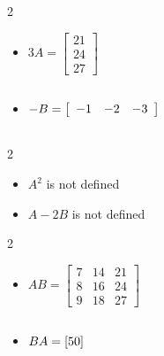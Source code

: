 \documentclass{ximera}
\begin{document}
\begin{enumerate}
\begin{multicols}{2}
\begin{itemize}
\item  $3A = \left[ \begin{array}{r} 21 \\ 24 \\ 27 \end{array} \right]$

\item $-B = \left[ \begin{array}{rrr} -1 & -2 & -3 \end{array} \right] \vphantom{\left[ \begin{array}{r} 21 \\ 24 \\ 27 \end{array} \right]}$

\end{itemize}
\end{multicols}


\begin{multicols}{2}
\begin{itemize}

\item $A^2$ is not defined

\item  $A-2B$ is not defined

\end{itemize}
\end{multicols}

\begin{multicols}{2}
\begin{itemize}

\item $AB = \left[ \begin{array}{rrr} 7 & 14 & 21 \\ 8 & 16 & 24 \\ 9 & 18 & 27 \end{array} \right]$

\item $BA = [50] \vphantom{\left[ \begin{array}{rrr} 7 & 14 & 21 \\ 8 & 16 & 24 \\ 9 & 18 & 27 \end{array} \right]}$

\end{itemize}
\end{multicols}





\end{enumerate}
\end{document}
